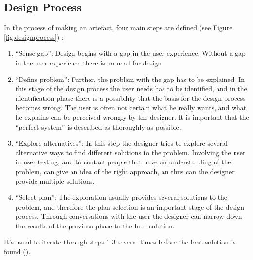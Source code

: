 \subsection{Design Process}
\label{sec:designprocess}
In the process of making an artefact, four main steps are defined (see Figure \ref{fig:designprocess}) :
\begin{enumerate}
 \item ``Sense gap'': Design begins with a gap in the user experience. Without a gap in the user experience there is no need for design.
 \item ``Define problem'': Further, the problem with the gap has to be explained. In this stage of the design process the user needs has to be identified, and in the identification phase there is a possibility that the basis for the design process becomes wrong. The user is often not certain what he really wants, and what he explains can be perceived wrongly by the designer. It is important that the ``perfect system'' is described as thoroughly as possible.
 \item ``Explore alternatives'': In this step the designer tries to explore several alternative ways to find  different solutions to the problem. Involving the user in user testing, and to contact people that have an understanding of the problem, can give an idea of the right approach, an thus can the designer provide multiple solutions.
     \item ``Select plan'': The exploration usually provides several solutions to the problem, and therefore the plan selection is an important stage of the design process. Through conversations with the user the designer can narrow down the results of the previous phase to the best solution.
 \end{enumerate}
 It's usual to iterate through steps 1-3 several times before the best solution is found (\cite{ulrich}).
 
